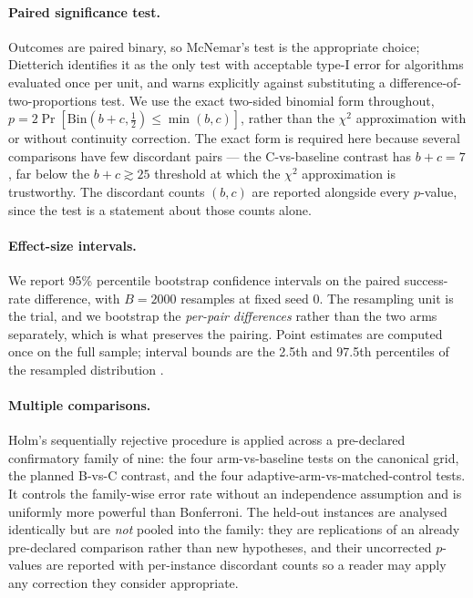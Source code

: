 \documentclass[preprint,11pt]{elsarticle}
\begin{document}
\paragraph{Paired significance test.} Outcomes are paired binary, so
McNemar's test \cite{mcnemar1947} is the appropriate choice; Dietterich
\cite{dietterich1998} identifies it as the only test with acceptable
type-I error for algorithms evaluated once per unit, and warns explicitly
against substituting a difference-of-two-proportions test. We use the
exact two-sided binomial form throughout,
$p=2\Pr[\mathrm{Bin}(b+c,\tfrac12)\le\min(b,c)]$, rather than the
$\chi^2$ approximation with or without continuity correction. The exact
form is required here because several comparisons have few discordant
pairs --- the C-vs-baseline contrast has $b+c=7$, far below the
$b+c\gtrsim25$ threshold at which the $\chi^2$ approximation is
trustworthy. The discordant counts $(b,c)$ are reported alongside every
$p$-value, since the test is a statement about those counts alone.

\paragraph{Effect-size intervals.} We report 95\% percentile bootstrap
confidence intervals on the paired success-rate difference, with
$B=2000$ resamples at fixed seed 0. The resampling unit is the trial, and
we bootstrap the \emph{per-pair differences} rather than the two arms
separately, which is what preserves the pairing. Point estimates are
computed once on the full sample; interval bounds are the 2.5th and
97.5th percentiles of the resampled distribution \cite{efron1993}.

\paragraph{Multiple comparisons.} Holm's sequentially rejective procedure
\cite{holm1979} is applied across a pre-declared confirmatory family of
nine: the four arm-vs-baseline tests on the canonical grid, the planned
B-vs-C contrast, and the four adaptive-arm-vs-matched-control tests. It
controls the family-wise error rate without an independence assumption
and is uniformly more powerful than Bonferroni. The held-out instances
are analysed identically but are \emph{not} pooled into the family: they
are replications of an already pre-declared comparison rather than new
hypotheses, and their uncorrected $p$-values are reported with
per-instance discordant counts so a reader may apply any correction they
consider appropriate.
\end{document}
